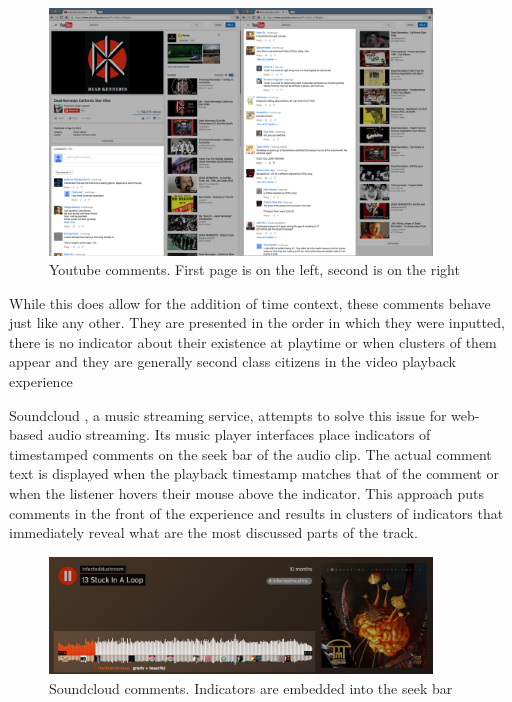    \begin{figure}[thpb]
      \centering
      \includegraphics[width=4in]{figures/youtube-left.png}
      \caption{Youtube comments. First page is on the left, second is on the right}
      \label{fig_youtube_comments}
   \end{figure}

While this does allow for the addition of time context, these comments behave just like any other. They are presented in the order in which they were inputted, there is no indicator about their existence at playtime or when clusters of them appear and they are generally second class citizens in the video playback experience

Soundcloud \cite{soundcloud}, a music streaming service, attempts to solve this issue for web-based audio streaming. Its music player interfaces place indicators of timestamped comments on the seek bar of the audio clip. The actual comment text is displayed when the playback timestamp matches that of the comment or when the listener hovers their mouse above the indicator. This approach puts comments in the front of the experience and results in clusters of indicators that immediately reveal what are the most discussed parts of the track.

   \begin{figure}[thpb]
      \centering
      \includegraphics[width=4in]{figures/soundcloud.png}
      \caption{Soundcloud comments. Indicators are embedded into the seek bar}
      \label{fig_youtube_comments}
   \end{figure}

